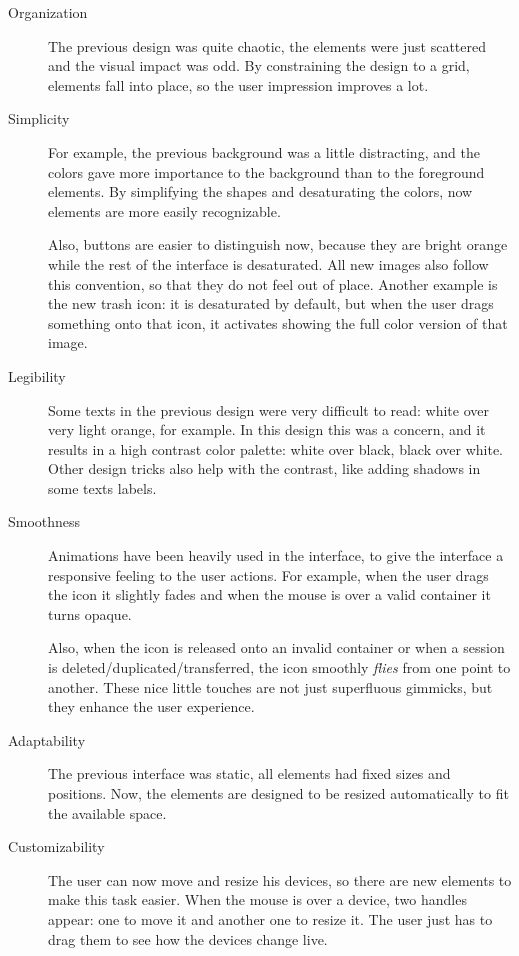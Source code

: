 \begin{description}
  \item[Organization] The previous design was quite chaotic, the elements were just scattered and the visual impact was odd.
  By constraining the design to a grid, elements fall into place, so the user impression improves a lot.
  \item[Simplicity] For example, the previous background was a little distracting, and the colors gave more importance to the background than to the foreground elements.
  By simplifying the shapes and desaturating the colors, now elements are more easily recognizable.
  
  Also, buttons are easier to distinguish now, because they are bright orange while the rest of the interface is desaturated.
  All new images also follow this convention, so that they do not feel out of place.
  Another example is the new trash icon: it is desaturated by default, but when the user drags something onto that icon, it activates showing the full color version of that image.
  \item[Legibility] Some texts in the previous design were very difficult to read: white over very light orange, for example.
  In this design this was a concern, and it results in a high contrast color palette: white over black, black over white.
  Other design tricks also help with the contrast, like adding shadows in some texts labels.
  \item[Smoothness] Animations have been heavily used in the interface, to give the interface a responsive feeling to the user actions.
  For example, when the user drags the icon it slightly fades and when the mouse is over a valid container it turns opaque.
  
  Also, when the icon is released onto an invalid container or when a session is deleted/duplicated/transferred, the icon smoothly \emph{flies} from one point to another.
  These nice little touches are not just superfluous gimmicks, but they enhance the user experience.
  \item[Adaptability] The previous interface was static, all elements had fixed sizes and positions.
  Now, the elements are designed to be resized automatically to fit the available space.
  \item[Customizability] The user can now move and resize his devices, so there are new elements to make this task easier.
  When the mouse is over a device, two handles appear: one to move it and another one to resize it.
  The user just has to drag them to see how the devices change live.
  

\end{description}

